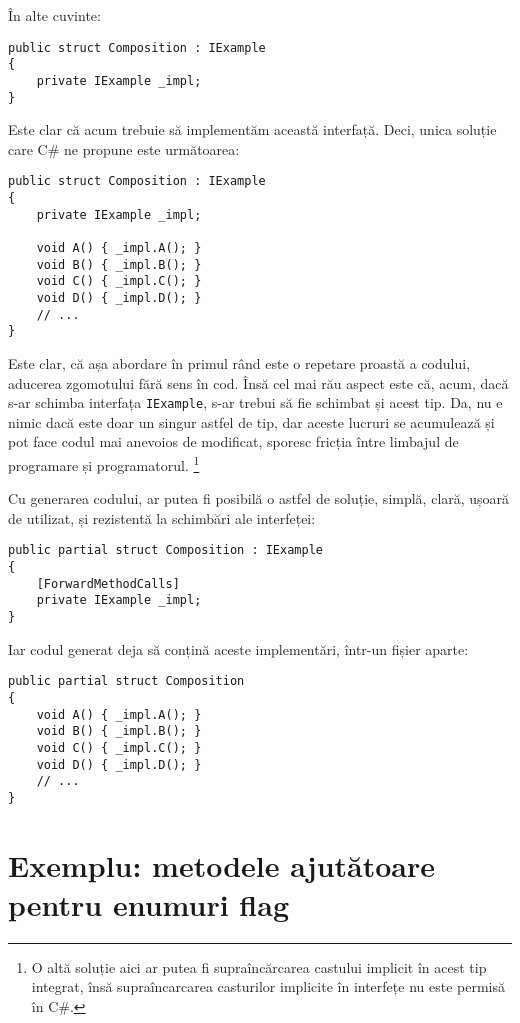 \documentclass[a4paper,12pt]{report}
\begin{document}
În alte cuvinte:

\begin{verbatim}
public struct Composition : IExample
{
    private IExample _impl;
}
\end{verbatim}

Este clar că acum trebuie să implementăm această interfață.
Deci, unica soluție care C\# ne propune este următoarea:

\begin{verbatim}
public struct Composition : IExample
{
    private IExample _impl;

    void A() { _impl.A(); }
    void B() { _impl.B(); }
    void C() { _impl.C(); }
    void D() { _impl.D(); }
    // ...
}
\end{verbatim}

Este clar, că așa abordare în primul rând este o repetare proastă a codului, aducerea zgomotului fără sens în cod.
Însă cel mai rău aspect este că, acum, dacă s-ar schimba interfața \texttt{IExample}, s-ar trebui să fie schimbat și acest tip. 
Da, nu e nimic dacă este doar un singur astfel de tip, dar aceste lucruri se acumulează și pot face codul mai anevoios de modificat, sporesc fricția între limbajul de programare și programatorul. \footnote{
  O altă soluție aici ar putea fi supraîncărcarea castului implicit în acest tip integrat,
  însă supraîncarcarea casturilor implicite în interfețe nu este permisă în C\#.
}

Cu generarea codului, ar putea fi posibilă o astfel de soluție, simplă, clară, ușoară de utilizat, și rezistentă la schimbări ale interfeței:

\begin{verbatim}
public partial struct Composition : IExample
{
    [ForwardMethodCalls]
    private IExample _impl;
}
\end{verbatim}

Iar codul generat deja să conțină aceste implementări, într-un fișier aparte:

\begin{verbatim}
public partial struct Composition
{
    void A() { _impl.A(); }
    void B() { _impl.B(); }
    void C() { _impl.C(); }
    void D() { _impl.D(); }
    // ...
}
\end{verbatim}


\section{Exemplu: metodele ajutătoare pentru enumuri flag}
\end{document}
